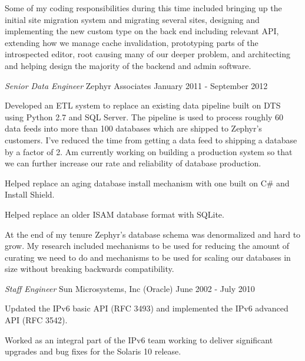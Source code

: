 \documentclass[margin]{res}
\begin{document}
\begin{resume}
                Some of my coding responsibilities during this time included bringing
                up the initial site migration system and migrating several sites,
                designing and implementing the new custom type on the back end including relevant API,
                extending how we manage cache invalidation, prototyping parts of the introspected editor,
                root causing many of our deeper problem, and architecting and helping
                design the majority of the backend and admin software.

                {\sl\large Senior Data Engineer} Zephyr Associates \hfill January 2011 - September 2012

                Developed an ETL system to replace an existing data
                pipeline built on DTS using Python 2.7 and SQL Server. The
                pipeline is used to process roughly 60 data feeds into
                more than 100 databases which are shipped to Zephyr's
                customers. I've reduced the time from getting a data feed
                to shipping a database by a factor of 2. Am currently
                working on building a production system so that we can
                further increase our rate and reliability of database
                production.

                Helped replace an aging database install mechanism with
                one built on C\# and Install Shield.

                Helped replace an older ISAM database format with SQLite.

                At the end of my tenure Zephyr's database schema was
                denormalized and hard to grow. My research included
                mechanisms to be used for reducing the amount of
                curating we need to do and mechanisms to be used for
                scaling our databases in size without breaking backwards
                compatibility.

                {\sl\large Staff Engineer} Sun Microsystems, Inc (Oracle) \hfill June 2002 - July 2010

                Updated the IPv6 basic API (RFC 3493) and implemented the IPv6 advanced API (RFC 3542).

                Worked as an integral part of the IPv6 team working
                to deliver significant upgrades and bug fixes for the
                Solaris 10 release.


\end{resume}
\end{document}
